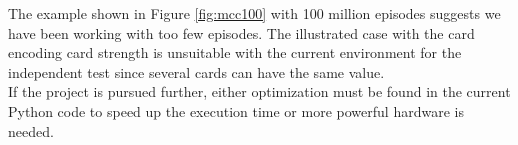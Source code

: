 \vspace*{0.5cm}

\noindent
The example shown in Figure \ref{fig:mcc100} with 100 million episodes suggests we have been working with too few episodes. The illustrated case with the card encoding card strength is unsuitable with the current environment for the independent test since several cards can have the same value. \\
If the project is pursued further, either optimization must be found in the current Python code to speed up the execution time or more powerful hardware is needed. 
